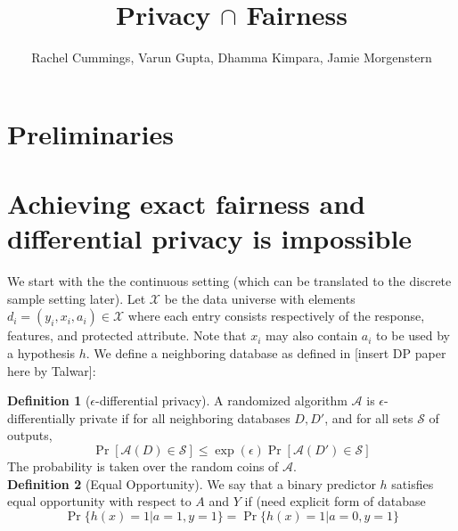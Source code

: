 \documentclass[runningheads]{article}
\newcommand{\A}{\mathcal{A}}
\renewcommand{\H}{\mathcal{H}}
\newcommand{\1}{\mathbbm{1}}
\renewcommand{\S}{\mathcal{S}}
\theoremstyle{definition}
\begin{document}
 
\title{Privacy $\cap$ Fairness}
\author{Rachel Cummings, Varun Gupta, Dhamma Kimpara, Jamie Morgenstern}
\maketitle


\section{Preliminaries}




\section{Achieving exact fairness and differential privacy is impossible}
We start with the the continuous setting (which can be translated to the discrete sample setting later). Let $\mathcal{X}$ be the data universe with elements $d_i = (y_i,x_i,a_i) \in \mathcal{X}$ where each entry consists respectively of the response, features, and protected attribute. Note that $x_i$ may also contain $a_i$ to be used by a hypothesis $h$. We define a neighboring database as defined in [insert DP paper here by Talwar]:

{\bf Definition 1} ($\epsilon$-differential privacy). A randomized algorithm $\A$ is $\epsilon$-differentially private if for all neighboring databases $D, D'$, and for all sets $\S$ of outputs, 
$$\Pr[\A(D)\in \S] \leq \exp(\epsilon)\Pr[\A(D')\in \S]$$
The probability is taken over the random coins of $\A$.\\
{\bf Definition 2} (Equal Opportunity). We say that a binary predictor $h$ satisfies equal opportunity with respect to $A$ and $Y$ if (need explicit form of database
$$\Pr\{h(x) = 1 | a = 1, y = 1\} = \Pr\{h(x) = 1 | a=0, y=1\}$$ 
\end{document}
